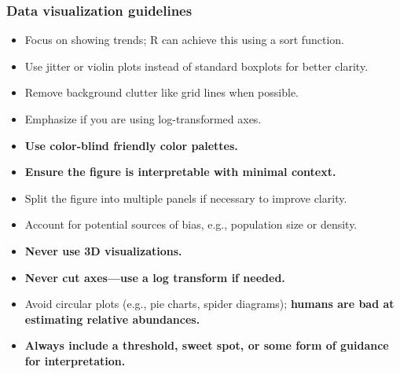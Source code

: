 \documentclass{article}
\begin{document}
	\subsubsection*{Data visualization guidelines}
	\begin{itemize}
		\item Focus on showing trends; R can achieve this using a sort function.
		\item Use jitter or violin plots instead of standard boxplots for better clarity.
		\item Remove background clutter like grid lines when possible.
		\item Emphasize if you are using log-transformed axes.
		\item \textbf{Use color-blind friendly color palettes.}
		\item \textbf{Ensure the figure is interpretable with minimal context.}
		\item Split the figure into multiple panels if necessary to improve clarity.
		\item Account for potential sources of bias, e.g., population size or density.
		\item \textbf{Never use 3D visualizations.}
		\item \textbf{Never cut axes—use a log transform if needed.}
		\item Avoid circular plots (e.g., pie charts, spider diagrams); \textbf{humans are bad at estimating relative abundances.}
		\item \textbf{Always include a threshold, sweet spot, or some form of guidance for interpretation.}
	\end{itemize}
	
	
\end{document}
